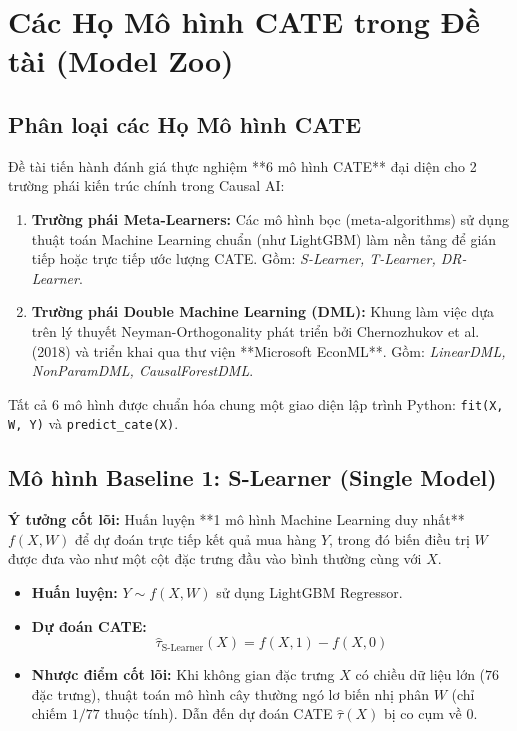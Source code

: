 
\chapter{Các Họ Mô hình CATE trong Đề tài (Model Zoo)}

\section{Phân loại các Họ Mô hình CATE}

Đề tài tiến hành đánh giá thực nghiệm **6 mô hình CATE** đại diện cho 2 trường phái kiến trúc chính trong Causal AI:

\begin{enumerate}[leftmargin=*]
    \item \textbf{Trường phái Meta-Learners:} Các mô hình bọc (meta-algorithms) sử dụng thuật toán Machine Learning chuẩn (như LightGBM) làm nền tảng để gián tiếp hoặc trực tiếp ước lượng CATE. Gồm: \textit{S-Learner, T-Learner, DR-Learner}.
    \item \textbf{Trường phái Double Machine Learning (DML):} Khung làm việc dựa trên lý thuyết Neyman-Orthogonality phát triển bởi Chernozhukov et al. (2018) và triển khai qua thư viện **Microsoft EconML**. Gồm: \textit{LinearDML, NonParamDML, CausalForestDML}.
\end{enumerate}

Tất cả 6 mô hình được chuẩn hóa chung một giao diện lập trình Python: \texttt{fit(X, W, Y)} và \texttt{predict\_cate(X)}.

\section{Mô hình Baseline 1: S-Learner (Single Model)}

\textbf{Ý tưởng cốt lõi:} Huấn luyện **1 mô hình Machine Learning duy nhất** $f(X, W)$ để dự đoán trực tiếp kết quả mua hàng $Y$, trong đó biến điều trị $W$ được đưa vào như một cột đặc trưng đầu vào bình thường cùng với $X$.

\begin{itemize}[leftmargin=*]
    \item \textbf{Huấn luyện:} $Y \sim f(X, W)$ sử dụng LightGBM Regressor.
    \item \textbf{Dự đoán CATE:}
    \begin{equation}
        \hat{\tau}_{\text{S-Learner}}(X) = f(X, 1) - f(X, 0)
    \end{equation}
    \item \textbf{Nhược điểm cốt lõi:} Khi không gian đặc trưng $X$ có chiều dữ liệu lớn ($76$ đặc trưng), thuật toán mô hình cây thường ngó lơ biến nhị phân $W$ (chỉ chiếm $1/77$ thuộc tính). Dẫn đến dự đoán CATE $\hat{\tau}(X)$ bị co cụm về $0$.
\end{itemize}

